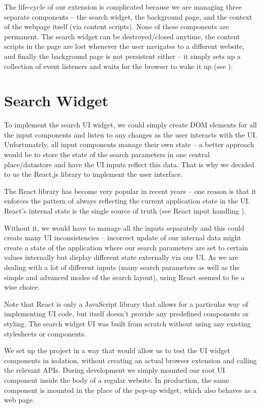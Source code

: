 \documentclass[bsc,frontabs,twoside,singlespacing,parskip,deptreport]{infthesis}
\begin{document}
The life-cycle of our extension is complicated because we are managing three separate components -- the search widget, the background page, and the context of the webpage itself (via content scripts). None of these components are permanent. The search widget can be destroyed/closed anytime, the content scripts in the page are lost whenever the user navigates to a different website, and finally the background page is not persistent either -- it simply sets up a collection of event listeners and waits for the browser to wake it up (see \cite{C6}).

\section{Search Widget}
To implement the search UI widget, we could simply create DOM elements for all the input components and listen to any changes as the user interacts with the UI. Unfortunately, all input components manage their own state -- a better approach would be to store the state of the search parameters in one central place/datastore and have the UI inputs reflect this data. That is why we decided to us the React.js library to implement the user interface.

The React library \cite{A3} has become very popular in recent years -- one reason is that it enforces the pattern of always reflecting the current application state in the UI. React's internal state is the single source of truth (see React input handling \cite{A4}).

Without it, we would have to manage all the inputs separately and this could create many UI inconsistencies -- incorrect update of our internal data might create a state of the application where our search parameters are set to certain values internally but display different state externally via our UI. As we are dealing with a lot of different inputs (many search parameters as well as the simple and advanced modes of the search layout), using React seemed to be a wise choice.

Note that React is only a JavaScript library that allows for a particular way of implementing UI code, but itself doesn't provide any predefined components or styling. The search widget UI was built from scratch without using any existing stylesheets or components.

We set up the project in a way that would allow us to test the UI widget components in isolation, without creating an actual browser extension and calling the relevant APIs. During development we simply mounted our root UI component inside the body of a regular website. In production, the same component is mounted in the place of the pop-up widget, which also behaves as a web page.
\end{document}
